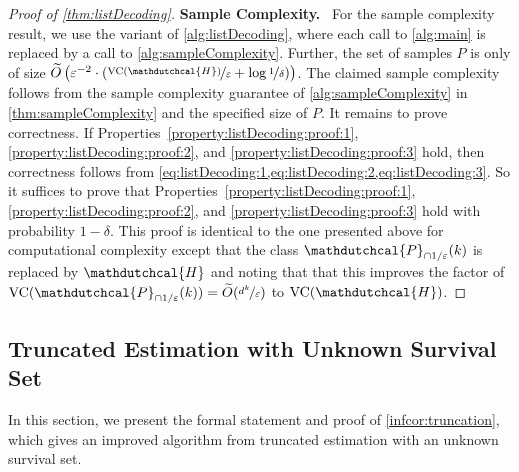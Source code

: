 \documentclass[11pt]{article}
\theoremstyle{plain}
\theoremstyle{definition}
\theoremstyle{remark}
\newcommand{\inparen}[1]{\left(#1\right)}
\newcommand{\nfrac}[2]{\nicefrac{#1}{#2}}
\newcommand{\vc}{\textrm{\rm VC}}
\newcommand{\eps}{\varepsilon}
\newcommand{\wt}[1]{\widetilde{#1}}
\renewcommand{\paragraph}[1]{\medskip \noindent\textbf{#1}~}
\newcommand{\hypo}[1]{\mathdutchcal{#1}}
\newcommand{\hyH}{\hypo{H}}
\newcommand{\hyP}{\hypo{P}}
\begin{document}
\begin{proof}[Proof of \cref{thm:listDecoding}]
                \paragraph{Sample Complexity.}
                For the sample complexity result, we use the variant of \cref{alg:listDecoding}, where each call to \cref{alg:main} is replaced by a call to \cref{alg:sampleComplexity}.
                Further, the set of samples $P$ is only of size $\wt{O}\inparen{\eps^{-2}\cdot \inparen{\nfrac{\vc(\hyH)}{\eps} + \log{\nfrac{1}{\delta}}}}$.
                The claimed sample complexity follows from the sample complexity guarantee of \cref{alg:sampleComplexity} in \cref{thm:sampleComplexity} and the specified size of $P$.
                It remains to prove correctness.
                If Properties~\ref{property:listDecoding:proof:1}, \ref{property:listDecoding:proof:2}, and \ref{property:listDecoding:proof:3}  hold, then correctness follows from \cref{eq:listDecoding:1,eq:listDecoding:2,eq:listDecoding:3}.
                So it suffices to prove that Properties~\ref{property:listDecoding:proof:1}, \ref{property:listDecoding:proof:2}, and \ref{property:listDecoding:proof:3}  hold with probability $1-\delta$.
                This proof is identical to the one presented above for computational complexity except that the class $\hyP_{\cap1/\eps}(k)$ is replaced by $\hyH$ and noting that that this improves the factor of $\vc{}(\hyP_{\cap1/\eps}(k))=\wt{O}(\nfrac{d^k}{\eps})$ to $\vc{}(\hyH)$.
            \end{proof}
            
            



    
    \subsection{Truncated Estimation with Unknown Survival Set}  
    \label{sec:application:unknownTruncation}
    In this section, we present the formal statement and proof of \cref{infcor:truncation}, which gives an improved algorithm from truncated estimation with an unknown survival set.
\end{document}
